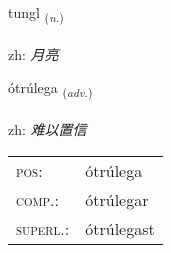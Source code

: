 \documentclass[frontgrid, backgrid]{flacards}\usepackage[]{graphicx}\usepackage[]{color}
\begin{document}
\renewcommand{\flhead}{\vskip5pt \fboxsep=0pt {\small\bfseries\footnotesize Nafnorð | 名词}}
\renewcommand{\fcfoot}{\vskip5pt \fboxsep=0pt \hspace{2pt}{\small\bfseries\footnotesize 2K}}

\renewcommand{\blhead}{\vskip5pt {\small\bfseries\footnotesize Nafnorð | 名词 }}
\renewcommand{\bcfoot}{\vskip5pt \hspace{2pt}{\small\bfseries\footnotesize 2K}}


{tungl \small{\textsubscript{(\textit{n.})}} \\[1ex] %
\textphonetic{[tʰuŋl]} \\
zh: \emph{月亮} \\  [2ex]
\renewcommand*{\arraystretch}{0.8}
}

\renewcommand{\flhead}{\vskip5pt \fboxsep=0pt {\small\bfseries\footnotesize Atviksorð | 副词}}
\renewcommand{\fcfoot}{\vskip5pt \fboxsep=0pt \hspace{2pt}{\small\bfseries\footnotesize 2K}}

\renewcommand{\blhead}{\vskip5pt {\small\bfseries\footnotesize Atviksorð | 副词 }}
\renewcommand{\bcfoot}{\vskip5pt \hspace{2pt}{\small\bfseries\footnotesize 2K}}


{ótrúlega \small{\textsubscript{(\textit{adv.})}} \\[1ex] %
\textphonetic{[ouːtʰrulɛɣa]} \\
zh: \emph{难以置信} \\  [2ex]
\renewcommand*{\arraystretch}{0.8}
\begin{tabular}{ll}
\textsc{pos}: & ótrúlega \\ 
\textsc{comp.}: & ótrúlegar \\ 
\textsc{superl.}: & ótrúlegast \\
\end{tabular}
}
\end{document}
